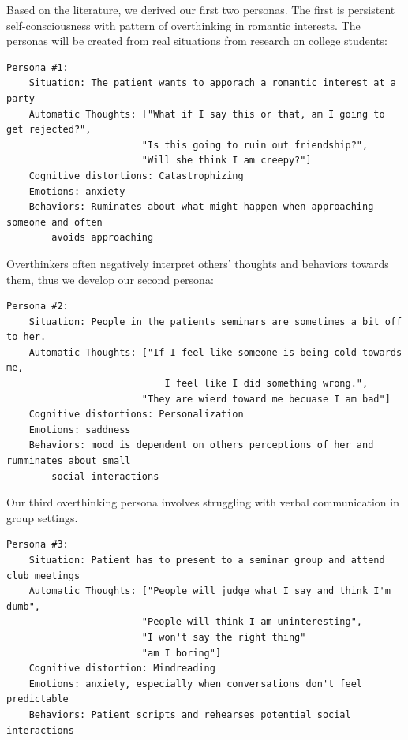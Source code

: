 \documentclass[twoside]{report}
\begin{document}
Based on the literature, we derived our first two personas. The first is persistent self-consciousness with pattern of overthinking in romantic interests. The personas will be created from real situations from research on college students:
\begin{verbatim}
Persona #1:
    Situation: The patient wants to apporach a romantic interest at a party
    Automatic Thoughts: ["What if I say this or that, am I going to get rejected?",
                        "Is this going to ruin out friendship?", 
                        "Will she think I am creepy?"]
    Cognitive distortions: Catastrophizing
    Emotions: anxiety
    Behaviors: Ruminates about what might happen when approaching someone and often
    	avoids approaching
\end{verbatim}
Overthinkers often negatively interpret others' thoughts and behaviors towards them, thus we develop our second persona:
\begin{verbatim}
Persona #2:
    Situation: People in the patients seminars are sometimes a bit off to her. 
    Automatic Thoughts: ["If I feel like someone is being cold towards me, 
                            I feel like I did something wrong.",
                        "They are wierd toward me becuase I am bad"]
    Cognitive distortions: Personalization
    Emotions: saddness
    Behaviors: mood is dependent on others perceptions of her and rumminates about small 
    	social interactions
\end{verbatim}
Our third overthinking persona involves struggling with verbal communication in group settings.
\begin{verbatim}
Persona #3:
    Situation: Patient has to present to a seminar group and attend club meetings
    Automatic Thoughts: ["People will judge what I say and think I'm dumb",
                        "People will think I am uninteresting", 
                        "I won't say the right thing"
                        "am I boring"]
    Cognitive distortion: Mindreading
    Emotions: anxiety, especially when conversations don't feel predictable
    Behaviors: Patient scripts and rehearses potential social interactions
\end{verbatim}
\end{document}
